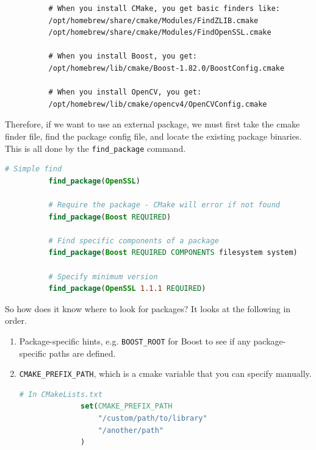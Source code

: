 \documentclass{article}
\newcounter{definition}[section]
\newcounter{example}[section]
\begin{document}
      \begin{example}
        \label{ex:cmake-finder-modules}
        \begin{lstlisting}
          # When you install CMake, you get basic finders like:
          /opt/homebrew/share/cmake/Modules/FindZLIB.cmake
          /opt/homebrew/share/cmake/Modules/FindOpenSSL.cmake

          # When you install Boost, you get:
          /opt/homebrew/lib/cmake/Boost-1.82.0/BoostConfig.cmake

          # When you install OpenCV, you get:
          /opt/homebrew/lib/cmake/opencv4/OpenCVConfig.cmake 
        \end{lstlisting}
      \end{example} 

      \begin{definition}
        \label{def:find-package}
        Therefore, if we want to use an external package, we must first take the cmake finder file, find the package config file, and locate the existing package binaries. This is all done by the \texttt{find\_package} command. 

        \begin{lstlisting}[language=CMake]
          # Simple find
          find_package(OpenSSL)

          # Require the package - CMake will error if not found
          find_package(Boost REQUIRED)

          # Find specific components of a package
          find_package(Boost REQUIRED COMPONENTS filesystem system)

          # Specify minimum version
          find_package(OpenSSL 1.1.1 REQUIRED) 
        \end{lstlisting}

        So how does it know where to look for packages? It looks at the following in order. 
        \begin{enumerate}
          \item Package-specific hints, e.g. \texttt{BOOST\_ROOT} for Boost to see if any package-specific paths are defined. 

          \item \texttt{CMAKE\_PREFIX\_PATH}, which is a cmake variable that you can specify manually. 
            \begin{lstlisting}[language=CMake]
              # In CMakeLists.txt
              set(CMAKE_PREFIX_PATH 
                  "/custom/path/to/library"
                  "/another/path"
              ) 
            \end{lstlisting}


\end{enumerate}
\end{definition}
\end{document}
